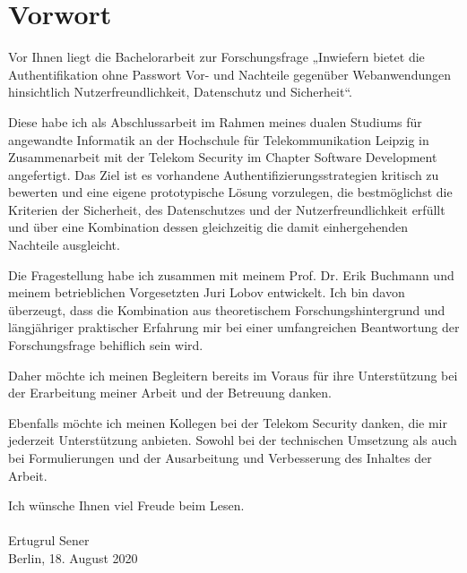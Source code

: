 \chapter{Vorwort}
Vor Ihnen liegt die Bachelorarbeit zur Forschungsfrage „Inwiefern bietet die Authentifikation ohne Passwort Vor- und Nachteile gegenüber Webanwendungen hinsichtlich Nutzerfreundlichkeit, Datenschutz und Sicherheit“.

Diese habe ich als Abschlussarbeit im Rahmen meines dualen Studiums für angewandte Informatik an der Hochschule für Telekommunikation Leipzig in Zusammenarbeit mit der Telekom Security im Chapter Software Development angefertigt. Das Ziel ist es vorhandene Authentifizierungsstrategien kritisch zu bewerten und eine eigene prototypische Lösung vorzulegen, die bestmöglichst die Kriterien der Sicherheit, des Datenschutzes und der Nutzerfreundlichkeit erfüllt und über eine Kombination dessen gleichzeitig die damit einhergehenden Nachteile ausgleicht.

Die Fragestellung habe ich zusammen mit meinem Prof. Dr. Erik Buchmann und meinem betrieblichen Vorgesetzten Juri Lobov entwickelt. Ich bin davon überzeugt, dass die Kombination aus theoretischem Forschungshintergrund und längjähriger praktischer Erfahrung mir bei einer umfangreichen Beantwortung der Forschungsfrage behiflich sein wird.

Daher möchte ich meinen Begleitern bereits im Voraus für ihre Unterstützung bei der Erarbeitung meiner Arbeit und der Betreuung danken.

Ebenfalls möchte ich meinen Kollegen bei der Telekom Security danken, die mir jederzeit Unterstützung anbieten. Sowohl bei der technischen Umsetzung als auch bei Formulierungen und der Ausarbeitung und Verbesserung des Inhaltes der Arbeit.

Ich wünsche Ihnen viel Freude beim Lesen.\\
\\
Ertugrul Sener\\
Berlin, 18. August 2020
